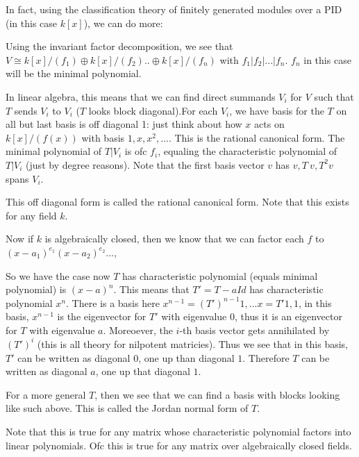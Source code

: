 \documentclass[main.tex]{subfiles}
\begin{document}
In fact, using the classification theory of finitely generated modules over a PID (in this case $k[x]$), we can do more:

Using the invariant factor decomposition, we see that $V \cong k[x]/(f_1) \oplus k[x]/(f_2) .. \oplus k[x]/(f_n)$ with $f_1 | f_2 | ... | f_n$. $f_n$ in this case will be the minimal polynomial. 

In linear algebra, this means that we can find direct summands $V_i$ for $V$ such that $T$ sends $V_i$ to $V_i$ ($T$ looks block diagonal).For each $V_i$, we have basis for the $T$ on all but last basis is off diagonal 1: just think about how $x$ acts on $k[x]/(f(x))$ with basis $1, x, x^2, ...$. This is the rational canonical form. The minimal polynomial of $T|V_i$ is ofc $f_i$, equaling the characteristic polynomial of $T|V_i$ (just by degree reasons). Note that the first basis vector $v$ has $v, T\ v, T^2 v $ spans $V_i$.

This off diagonal form is called the rational canonical form. Note that this exists for any field $k$. 

Now if $k$ is algebraically closed, then we know that we can factor each $f$ to $(x-a_1)^{e_1} (x - a_2)^{e_2}...$,

So we have the case now $T$ has characteristic polynomial (equals minimal polynomial) is $(x-a)^n$. This means that $T ' = T - a Id$ has characteristic polynomial $x^n$. There is a basis here $x^{n-1} = (T')^{n-1} 1,... x = T' 1, 1$, in this basis, $x^{n-1}$ is the eigenvector for $T'$ with eigenvalue $0$, thus it is an eigenvector for $T$ with eigenvalue $a$. Moreoever, the $i$-th basis vector gets annihilated by $(T')^i$ (this is all theory for nilpotent matricies). Thus we see that in this basis, $T'$ can be written as diagonal $0$, one up than diagonal $1$. Therefore $T$ can be written as diagonal $a$, one up that diagonal $1$. 

For a more general $T$, then we see that we can find a basis with blocks looking like such above. This is called the Jordan normal form of $T$.

\begin{remark}
Note that this is true for any matrix whose characteristic polynomial factors into linear polynomials. Ofc this is true for any matrix over algebraically closed fields.
\end{remark}
\end{document}
